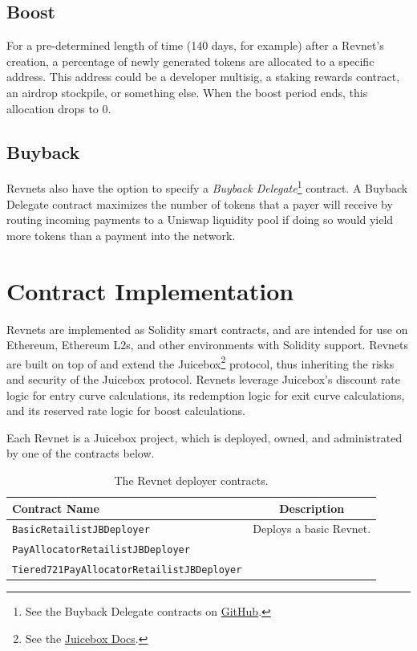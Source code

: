 \documentclass{article}
\begin{document}
\subsection{Boost}

For a pre-determined length of time (140 days, for example) after a Revnet's creation, a percentage of newly generated tokens are allocated to a specific address. This address could be a developer multisig, a staking rewards contract, an airdrop stockpile, or something else. When the boost period ends, this allocation drops to 0.

\subsection{Buyback}\label{sec:buyback}

Revnets also have the option to specify a \textit{Buyback Delegate}\footnote{See the Buyback Delegate contracts on \href{https://github.com/jbx-protocol/juice-buyback}{GitHub}.} contract. A Buyback Delegate contract maximizes the number of tokens that a payer will receive by routing incoming payments to a Uniswap liquidity pool if doing so would yield more tokens than a payment into the network.

\section{Contract Implementation}

Revnets are implemented as Solidity smart contracts, and are intended for use on Ethereum, Ethereum L2s,  and other environments with Solidity support. Revnets are built on top of and extend the Juicebox\footnote{See the \href{https://docs.juicebox.money}{Juicebox Docs}.} protocol, thus inheriting the risks and security of the Juicebox protocol. Revnets leverage Juicebox's discount rate logic for entry curve calculations, its redemption logic for exit curve calculations, and its reserved rate logic for boost calculations.

Each Revnet is a Juicebox project, which is deployed, owned, and administrated by one of the contracts below.

\begin{table}[h]
  \centering
  \begin{tabular}{|l|c|}
    \hline
    Contract Name & Description \\
    \hline
    \texttt{BasicRetailistJBDeployer} & Deploys a basic Revnet. \\
    \hline
    \texttt{PayAllocatorRetailistJBDeployer} & \\
    \hline
    \texttt{Tiered721PayAllocatorRetailistJBDeployer} & \\
    \hline
  \end{tabular}
  \caption{The Revnet deployer contracts.}
\end{table}
\end{document}
